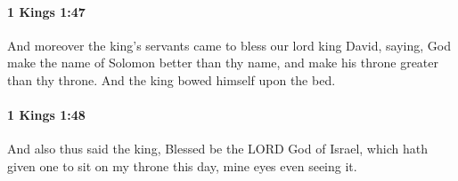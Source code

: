 		\paragraph{1 Kings 1:47} %
			\label{1KINGS-1-47}

			And moreover the king’s servants came to bless our lord king David, saying, God make the name of Solomon better than thy name, and make his throne greater than thy throne. And the king bowed himself upon the bed.


		\paragraph{1 Kings 1:48} %
			\label{1KINGS-1-48}

			And also thus said the king, Blessed be the LORD God of Israel, which hath given one to sit on my throne this day, mine eyes even seeing it.


